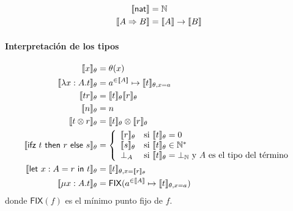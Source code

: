\documentclass[twoside,a4paper,12pt]{article}
\theoremstyle{definition}
\theoremstyle{remark}
\begin{document}
\begin{align*}
  \sem{\nat}           &= \mathbb N \\
  \sem{A\Rightarrow B} &= \sem A\to\sem B \\
\end{align*}

\paragraph{Interpretación de los tipos}

\begin{align*}
  \semT{x}             &= \theta(x) \\
  \semT{\fun{x:A}t}    &= \funSem{a}{A}{\semT[\theta,x=a]{t}} \\
  \semT{tr}            &= \semT{t} \semT{r} \\
  \semT{n}             &= n \\
  \semT{t\otimes r}    &= \semT{t} \otimes \semT{r} \\
  \semT{\ifz trs}      &=
    \left\{\begin{array}{ll}
      \semT{r} & \textrm{si }\semT{t} = 0 \\
      \semT{s} & \textrm{si }\semT{t} \in \mathbb{N^*} \\
      \bot_{A} & \textrm{si }\semT{t} = \bot_{\mathbb N} \textrm{ y $A$ es el tipo del término}
    \end{array}\right. \\
  \semT{\letl{x:A}{r}{t}} &= \semT[\theta,x=\semT{r}]{t} \\
  \semT{\fix{x:A}{t}}     &= \FIX(\funSem{a}{A}{\semT[\theta,x=a]{t}})
\end{align*}
donde $\mathsf{FIX}(f)$ es el mínimo punto fijo de $f$.
\end{document}
